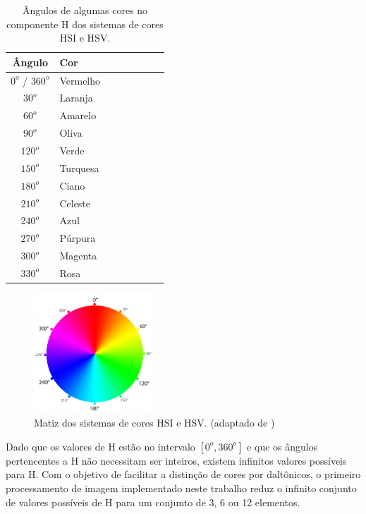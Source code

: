 \documentclass[	12pt, Times, openright, twoside, a4paper, english, brazil]{abntex2}
\begin{document}
\begin{table}[ht]
\centering
\begin{tabular}{clcccccc}
\hline      

\textbf{Ângulo}     & \textbf{Cor}  \\ \hline
$0^o$ / $360^o$     & Vermelho      \\ \hline
$30^o$              & Laranja       \\ \hline
$60^o$              & Amarelo       \\ \hline
$90^o$              & Oliva         \\ \hline
$120^o$             & Verde         \\ \hline
$150^o$             & Turquesa      \\ \hline
$180^o$             & Ciano         \\ \hline
$210^o$             & Celeste       \\ \hline
$240^o$             & Azul          \\ \hline
$270^o$             & Púrpura       \\ \hline
$300^o$             & Magenta       \\ \hline
$330^o$             & Rosa          \\ \hline

\end{tabular}
\caption{Ângulos de algumas cores no componente H dos sistemas de cores HSI e HSV.}
\label{tab:coresEmH}
\end{table}

\begin{figure}[!htb]
\centering \includegraphics[width=0.40\textwidth]{figuraColorsH.PNG}
\caption{Matiz dos sistemas de cores HSI e HSV. (adaptado de ) \label{fig:figuraColorsH}}
\end{figure}

Dado que os valores de H estão no intervalo $[0^o,360^o]$ e que os ângulos pertencentes a H não necessitam ser inteiros, existem infinitos valores possíveis para H. Com o objetivo de facilitar a distinção de cores por daltônicos, o primeiro processamento de imagem implementado neste trabalho reduz o infinito conjunto de valores possíveis de H para um conjunto de 3, 6 ou 12 elementos.
\end{document}

